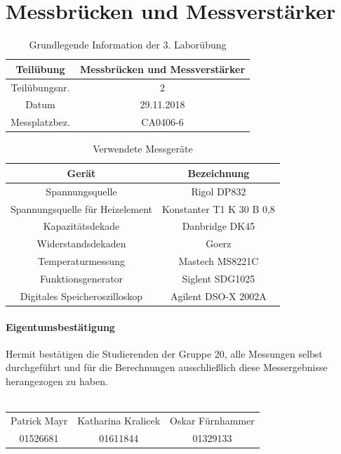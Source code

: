 \chapter{Messbrücken und Messverstärker}
\begin{table}[h]
	\centering
	\begin{tabular}{|c|c|}
		\hline 
		Teilübung 	& Messbrücken und Messverstärker \\
		\hline 
		Teilübungsnr. 		& 2	 \\ 
		\hline 
		Datum 		& 29.11.2018 \\ 
		\hline 
		Messplatzbez. 	& CA0406-6  \\
		\hline
	\end{tabular} 
	\caption{Grundlegende Information der 3. Laborübung}
\end{table}
\noindent
\begin{table}[h]
	\begin{tabular}{|c|c|}
	\hline 
	Gerät & Bezeichnung \\ 
	\hline 
	Spannungsquelle & Rigol DP832\\ 
	\hline 
	Spannungsquelle für Heizelement & Konstanter T1 K 30 B 0,8 \\ 
	\hline 
	Kapazitätsdekade & Danbridge DK45\\ 
	\hline 
	Widerstandsdekaden & Goerz \\ 
	\hline 
	Temperaturmessung & Mastech MS8221C\\ 
	\hline 
	Funktionsgenerator & Siglent SDG1025\\ 
	\hline 
	Digitales Speicheroszilloskop & Agilent DSO-X 2002A\\ 
	\hline 
	\end{tabular} 
	\centering
	\caption{Verwendete Messgeräte}
	\label{tb:messgeraete}
\end{table}

\subsubsection{Eigentumsbestätigung}
Hermit bestätigen die Studierenden der Gruppe 20, alle Messungen selbst durchgeführt und für die Berechnungen ausschließlich diese Messergebnisse herangezogen zu haben. \\ \\
\begin{tabular*}{\textwidth}{c|c|c}
	Patrick Mayr & Katharina Kralicek & Oskar Fürnhammer \\ 
	01526681 & 01611844 & 01329133 \\ 
\end{tabular*}
